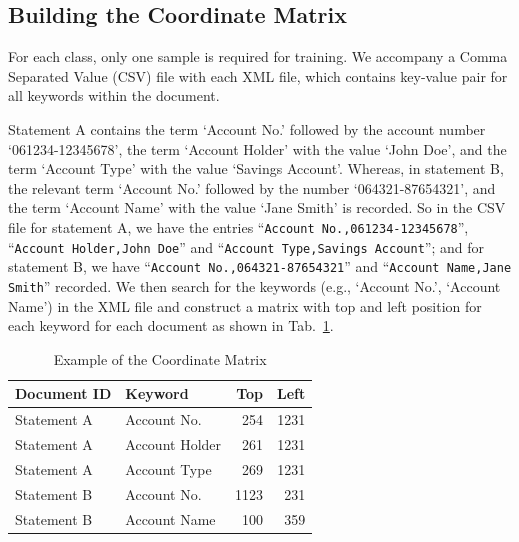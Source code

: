\subsection{Building the Coordinate Matrix}
For each class, only one sample is required for training. We accompany a Comma Separated Value (CSV) file with each XML file, which contains key-value pair for all keywords within the document.
\begin{example}
Statement A contains the term `Account No.’ followed by the account number `061234-12345678’, the term `Account Holder’ with the value `John Doe’, and the term `Account Type’ with the value `Savings Account’. Whereas, in statement B, the relevant term `Account No.’ followed by the number `064321-87654321’, and the term `Account Name’ with the value `Jane Smith’ is recorded. So in the CSV file for statement A, we have the entries ``\texttt{Account No.,061234-12345678}'', ``\texttt{Account Holder,John Doe}'' and ``\texttt{Account Type,Savings Account}''; and for statement B, we have ``\texttt{Account No.,064321-87654321}'' and ``\texttt{Account Name,Jane Smith}'' recorded. We then search for the keywords (e.g., `Account No.', `Account Name') in the XML file and construct a matrix with top and left position for each keyword for each document as shown in Tab.~\ref{matrix}.
\end{example}
\begin{table}[t]
\centering
\caption{Example of the Coordinate Matrix}\label{matrix}
\begin{tabular}{llrr}
\toprule
Document ID & Keyword & Top & Left\\
\midrule
Statement A & Account No. & 254 & 1231\\
Statement A & Account Holder & 261 & 1231\\
Statement A & Account Type & 269 & 1231\\
Statement B & Account No. & 1123 & 231\\
Statement B & Account Name & 100 & 359\\
\bottomrule
\end{tabular}
\end{table}


